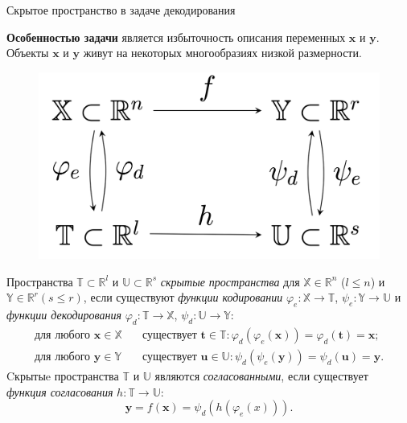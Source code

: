 \documentclass[10pt]{beamer}
\renewcommand{\phi}{\ensuremath{\varphi}}
\renewcommand{\leq}{\ensuremath{\leqslant}}
\newcommand{\bt}{\mathbf{t}}
\newcommand{\bu}{\mathbf{u}}
\newcommand{\bx}{\mathbf{x}}
\newcommand{\by}{\mathbf{y}}
\newcommand{\bbR}{\mathbb{R}}
\newcommand{\bbX}{\mathbb{X}}
\newcommand{\bbY}{\mathbb{Y}}
\newcommand{\bbT}{\mathbb{T}}
\newcommand{\bbU}{\mathbb{U}}
\begin{document}
\begin{frame}{Скрытое пространство в задаче декодирования}
	
	\textbf{Особенностью задачи} является избыточность описания переменных $\bx$ и $\by$.
	Объекты $\bx$ и $\by$ живут на некоторых многообразиях низкой размерности. 
	\begin{figure}
		\includegraphics[width=0.32\linewidth]{figs/decoding_scheme}
	\end{figure}
		
	Пространства $\bbT \subset \bbR^l$ и $\bbU \subset \bbR^s$ \textit{скрытые пространства} для $\bbX \in \bbR^n$ ($l \leq n$) и $\bbY \in \bbR^r (s \leq r)$, если существуют \textit{функции кодировании} $\varphi_e: \bbX \to \bbT$, $\psi_e: \bbY \to \bbU$ и \textit{функции декодирования} $\varphi_d: \bbT  \to \bbX$, $\psi_d: \bbU  \to \bbY$:
	\begin{align*}
	\text{для любого } \bx \in \bbX &\quad \text{существует } \bt \in \bbT: \varphi_d (\varphi_e(\bx)) = \varphi_d(\bt) = \bx; \\
	\text{для любого } \by \in \bbY &\quad  \text{существует } \bu \in \bbU: \psi_d (\psi_e(\by)) = \psi_d(\bu) = \by.
	\end{align*}
	Cкрытыe пространства $\bbT$ и $\bbU$ являются \textit{согласованными}, если существует \textit{функция согласования} $h: \bbT \rightarrow \bbU$:
	\[
		\by = f(\bx) = \psi_d(h(\phi_e(x))).
	 \]
	
\end{frame}
\end{document}

